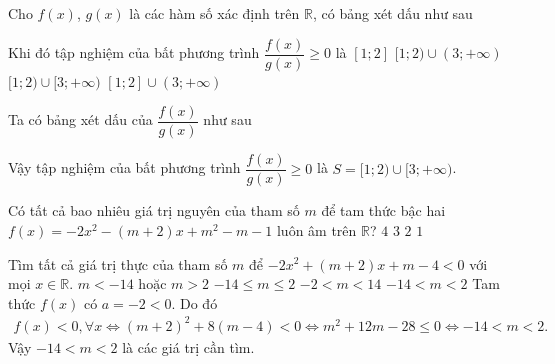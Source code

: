 \begin{ex}%
	Cho $f(x)$, $g(x)$ là các hàm số xác định trên $\mathbb{R}$, có bảng xét dấu như sau
	\begin{center}
	\end{center}
	Khi đó tập nghiệm của bất phương trình $\dfrac{f(x)}{g(x)}\geq 0$ là
	\choice
	{$[1;2]$}
	{$[1;2)\cup (3;+\infty)$}
	{\True $[1;2)\cup [3;+\infty)$}
	{$[1;2]\cup (3;+\infty)$}
	\loigiai
	{
		Ta có bảng xét dấu của $\dfrac{f(x)}{g(x)}$ như sau
		\begin{center}
		\end{center}
		Vậy tập nghiệm của bất phương trình $\dfrac{f(x)}{g(x)} \geq 0$ là $S=[1;2)\cup [3;+\infty)$.
	}
\end{ex}

\begin{ex}%
	Có tất cả bao nhiêu giá trị nguyên của tham số $m$ để tam thức bậc hai $f(x)=-2x^2-\left(m+2\right)x+m^2-m-1$ luôn âm trên $\mathbb{R}$?
	\choice
	{$4$}
	{$3$}
	{$2$}
	{\True $1$}
\end{ex}

\begin{ex}%
	Tìm tất cả giá trị thực của tham số $m$ để $-2x^2+(m+2)x+m-4 <0$ với mọi $x \in \mathbb{R}$. 
	\choice
	{$m<-14$ hoặc $m>2$}
	{$-14\le m\le 2$}
	{$-2<m<14$}
	{\True $-14<m<2$}
	\loigiai
	{
		Tam thức $f(x)$ có $a=-2<0$. Do đó
		\allowdisplaybreaks
		\begin{eqnarray*}
			f(x)<0,\forall x \Leftrightarrow (m+2)^2+8(m-4)<0 \Leftrightarrow m^2+12m-28\leq 0 \Leftrightarrow -14<m<2.
		\end{eqnarray*}
		Vậy $-14<m<2$ là các giá trị cần tìm.
	}
\end{ex}

